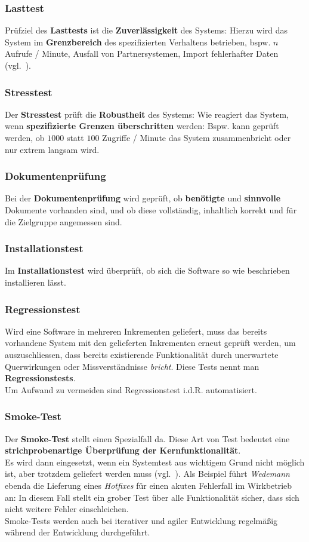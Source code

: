 \subsubsection*{Lasttest}
Prüfziel des \textbf{Lasttests} ist die \textbf{Zuverlässigkeit} des Systems: Hierzu wird das System im \textbf{Grenzbereich} des spezifizierten Verhaltens betrieben, bspw. $n$ Aufrufe / Minute, Ausfall von Partnersystemen, Import fehlerhafter Daten (vgl.~\cite[63]{Wed09c}).

\subsubsection*{Stresstest}
Der \textbf{Stresstest} prüft die \textbf{Robustheit} des Systems: Wie reagiert das System, wenn \textbf{spezifizierte Grenzen überschritten} werden: Bspw. kann geprüft werden, ob $1000$ statt $100$ Zugriffe / Minute das System zusammenbricht oder nur extrem langsam wird.

\subsubsection*{Dokumentenprüfung}
Bei der \textbf{Dokumentenprüfung} wird geprüft, ob \textbf{benötigte} und \textbf{sinnvolle} Dokumente vorhanden sind, und ob diese vollständig, inhaltlich korrekt und für die Zielgruppe angemessen sind.

\subsubsection*{Installationstest}
Im \textbf{Installationstest} wird überprüft, ob sich die Software so wie beschrieben installieren lässt.

\subsubsection*{Regressionstest}
Wird eine Software in mehreren Inkrementen geliefert, muss das bereits vorhandene System mit den gelieferten Inkrementen erneut geprüft werden, um auszuschliessen, dass bereits existierende Funktionalität durch unerwartete Querwirkungen oder Missverständnisse \textit{bricht}.
Diese Tests nennt man \textbf{Regressionstests}.\\
Um Aufwand zu vermeiden sind Regressionstest i.d.R. automatisiert.

\subsubsection*{Smoke-Test}
Der \textbf{Smoke-Test} stellt einen Spezialfall da.
Diese Art von Test bedeutet eine \textbf{strichprobenartige Überprüfung der Kernfunktionalität}.\\
Es wird dann eingesetzt, wenn ein Systemtest aus wichtigem Grund nicht möglich ist, aber trotzdem geliefert werden muss (vgl.~\cite[64]{Wed09c}).
Als Beispiel führt \textit{Wedemann} ebenda die Lieferung eines \textit{Hotfixes} für einen akuten Fehlerfall im Wirkbetrieb an: In diesem Fall stellt ein grober Test über alle Funktionalität sicher, dass sich nicht weitere Fehler einschleichen.\\
Smoke-Tests werden auch bei iterativer und agiler Entwicklung regelmäßig während der Entwicklung durchgeführt.